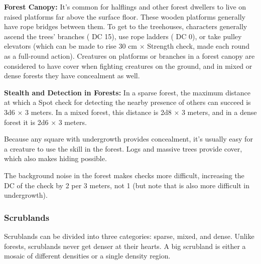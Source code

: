 
\textbf{Forest Canopy:} It's common for halflings and other forest dwellers to live on raised platforms far above the surface floor. These wooden platforms generally have rope bridges between them. To get to the treehouses, characters generally ascend the trees' branches ( DC 15), use rope ladders ( DC 0), or take pulley elevators (which can be made to rise 30 cm $\times$ Strength check, made each round as a full-round action). Creatures on platforms or branches in a forest canopy are considered to have cover when fighting creatures on the ground, and in mixed or dense forests they have concealment as well.

\textbf{Stealth and Detection in Forests:} In a sparse forest, the maximum distance at which a Spot check for detecting the nearby presence of others can succeed is 3d6 $\times$ 3 meters. In a mixed forest, this distance is 2d8 $\times$ 3 meters, and in a dense forest it is 2d6 $\times$ 3 meters.

Because any square with undergrowth provides concealment, it's usually easy for a creature to use the  skill in the forest. Logs and massive trees provide cover, which also makes hiding possible.

The background noise in the forest makes  checks more difficult, increasing the DC of the check by 2 per 3 meters, not 1 (but note that  is also more difficult in undergrowth).


\subsubsection{Scrublands}
Scrublands can be divided into three categories: sparse, mixed, and dense. Unlike forests, scrublands never get denser at their hearts. A big scrubland is either a mosaic of different densities or a single density region.

